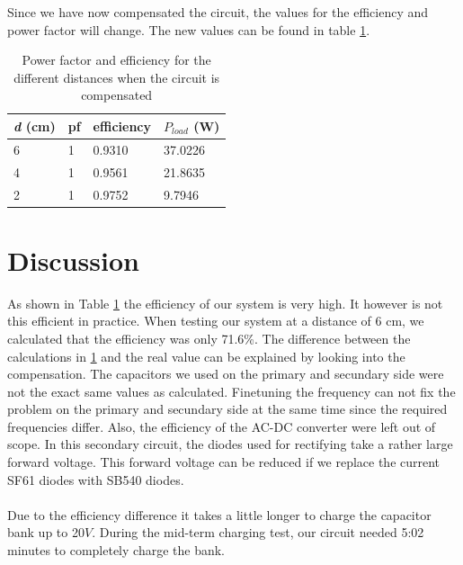 \documentclass[final]{scrreprt} %
\begin{document}
Since we have now compensated the circuit, the values for the efficiency and power factor will change. 
The new values can be found in table \ref{table3}. \\

\begin{table}[h]
\begin{center}
\begin{tabular}{ l | l | l | l }
    
    \textit{d} (cm)            & pf              & efficiency  &  $P_{load}$ (W)\\	\hline
    6                           & 1                     & 0.9310                & 37.0226  \\
    4                           &1                  & 0.9561                     & 21.8635\\
    2                           & 1                   & 0.9752                    &  9.7946 \\
\end{tabular}
\caption{Power factor and efficiency for the different distances when the circuit is compensated}
\label{table3}
\end{center}
\end{table}


\section*{Discussion}

As shown in Table \ref{table3} the efficiency of our system is very high. 
It however is not this efficient in practice.
When testing our system at a distance of 6 cm, we calculated that the efficiency was only 71.6\%.
The difference between the calculations in \ref{table3} and the real value can be explained by looking into the compensation. 
The capacitors we used on the primary and secundary side were not the exact same values as calculated.
Finetuning the frequency can not fix the problem on the primary and secundary side at the same time since the required frequencies differ. 
Also, the efficiency of the AC-DC converter were left out of scope.
In this secondary circuit, the diodes used for rectifying take a rather large forward voltage.
This forward voltage can be reduced if we replace the current SF61 diodes with SB540 diodes.
\\ \\
Due to the efficiency difference it takes a little longer to charge the capacitor bank up to 20$V$.
During the mid-term charging test, our circuit needed 5:02 minutes to completely charge the bank.
\end{document}
